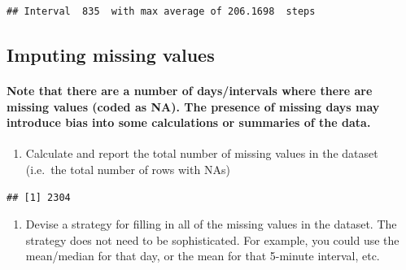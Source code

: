 \documentclass[]{article}
\newenvironment{Shaded}{\begin{snugshade}}{\end{snugshade}}
\newcommand{\KeywordTok}[1]{\textcolor[rgb]{0.13,0.29,0.53}{\textbf{#1}}}
\newcommand{\StringTok}[1]{\textcolor[rgb]{0.31,0.60,0.02}{#1}}
\newcommand{\OperatorTok}[1]{\textcolor[rgb]{0.81,0.36,0.00}{\textbf{#1}}}
\newcommand{\NormalTok}[1]{#1}
\providecommand{\tightlist}{%
  \setlength{\itemsep}{0pt}\setlength{\parskip}{0pt}}
\let\oldparagraph\paragraph
\renewcommand{\paragraph}[1]{\oldparagraph{#1}\mbox{}}
\begin{document}
\begin{verbatim}
## Interval  835  with max average of 206.1698  steps
\end{verbatim}

\subsection{Imputing missing values}\label{imputing-missing-values}

\paragraph{Note that there are a number of days/intervals where there
are missing values (coded as NA). The presence of missing days may
introduce bias into some calculations or summaries of the
data.}\label{note-that-there-are-a-number-of-daysintervals-where-there-are-missing-values-coded-as-na.-the-presence-of-missing-days-may-introduce-bias-into-some-calculations-or-summaries-of-the-data.}

\begin{enumerate}
\def\labelenumi{\arabic{enumi}.}
\tightlist
\item
  Calculate and report the total number of missing values in the dataset
  (i.e.~the total number of rows with NAs)
\end{enumerate}

\begin{Shaded}
\end{Shaded}

\begin{verbatim}
## [1] 2304
\end{verbatim}

\begin{enumerate}
\def\labelenumi{\arabic{enumi}.}
\setcounter{enumi}{1}
\tightlist
\item
  Devise a strategy for filling in all of the missing values in the
  dataset. The strategy does not need to be sophisticated. For example,
  you could use the mean/median for that day, or the mean for that
  5-minute interval, etc.
\end{enumerate}
\end{document}

